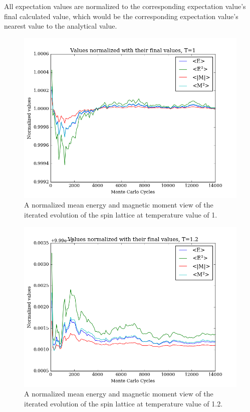 \documentclass[11pt,a4paper,notitlepage,twocolumn]{article}
\begin{document}
All expectation values are normalized to the corresponding expectation value's final calculated value, which would be the corresponding expectation value's nearest value to the analytical value.
\begin{figure}
[H]\center
\includegraphics[scale=0.35]{../figs/4c/Prob_L20_mc100000_T100_spinup.png}
\caption{A normalized mean energy and magnetic moment view of the iterated evolution of the spin lattice at temperature value of 1.}
\end{figure}
\begin{figure}
[H]\center
\includegraphics[scale=0.35]{../figs/4c/Prob_L20_mc100000_T120_spinup.png}
\caption{A normalized mean energy and magnetic moment view of the iterated evolution of the spin lattice at temperature value of 1.2.}
\end{figure}
\end{document}
